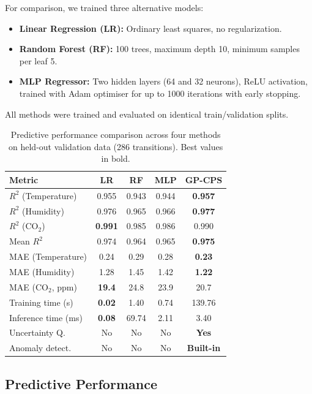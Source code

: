 \documentclass[conference]{IEEEtran}
\begin{document}
For comparison, we trained three alternative models:
\begin{itemize}[nosep]
\item \textbf{Linear Regression (LR):} Ordinary least squares, no regularization.
\item \textbf{Random Forest (RF):} 100 trees, maximum depth 10, minimum samples per leaf 5.
\item \textbf{MLP Regressor:} Two hidden layers (64 and 32 neurons), ReLU activation, trained with Adam optimiser for up to 1000 iterations with early stopping.
\end{itemize}

All methods were trained and evaluated on identical train/validation splits.

\begin{table}[t]
\centering
\caption{Predictive performance comparison across four methods on held-out validation data (286 transitions). Best values in bold.}
\label{tab:metrics}
\small
\begin{tabular}{lcccc}
\toprule
\textbf{Metric} & \textbf{LR} & \textbf{RF} & \textbf{MLP} & \textbf{GP-CPS} \\
\midrule
$R^2$ (Temperature) & 0.955 & 0.943 & 0.944 & \textbf{0.957} \\
$R^2$ (Humidity) & 0.976 & 0.965 & 0.966 & \textbf{0.977} \\
$R^2$ (CO$_2$) & \textbf{0.991} & 0.985 & 0.986 & 0.990 \\
Mean $R^2$ & 0.974 & 0.964 & 0.965 & \textbf{0.975} \\
\midrule
MAE (Temperature) & 0.24 & 0.29 & 0.28 & \textbf{0.23} \\
MAE (Humidity) & 1.28 & 1.45 & 1.42 & \textbf{1.22} \\
MAE (CO$_2$, ppm) & \textbf{19.4} & 24.8 & 23.9 & 20.7 \\
\midrule
Training time (s) & \textbf{0.02} & 1.40 & 0.74 & 139.76 \\
Inference time (ms) & \textbf{0.08} & 69.74 & 2.11 & 3.40 \\
\midrule
Uncertainty Q. & No & No & No & \textbf{Yes} \\
Anomaly detect. & No & No & No & \textbf{Built-in} \\
\bottomrule
\end{tabular}
\end{table}

\subsection{Predictive Performance}
\end{document}
